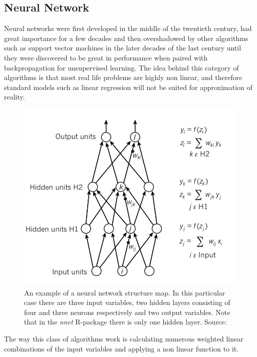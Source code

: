 \documentclass[a4paper,12pt]{article}
\begin{document}
\subsection{Neural Network}

Neural networks were first developed in the middle of the twentieth century, had great importance for a few decades and then overshadowed by other algorithms such as support vector machines in the later decades of the last century until they were discovered to be great in performance when paired with backpropagation for unsupervised learning.
The idea behind this category of algorithms is that most real life problems are highly non linear, and therefore standard models such as linear regression will not be suited for approximation of reality.
\begin{figure}
  \begin{minipage}[c]{0.65\textwidth}
    \includegraphics[width=\textwidth]{pictures/nnet_1.png}
  \end{minipage}\hfill
  \begin{minipage}[c]{0.35\textwidth}
    \caption{An example of a neural network structure map. In this particular case there are three input variables, two hidden layers consisting of four and three neurons respectively and two output variables.
    Note that in the \textit{nnet} R-package there is only one hidden layer. Source: \cite{lecun2015}}
    \label{Figure::Nnet_1}
  \end{minipage}
\end{figure}
The way this class of algorithms work is calculating numerous weighted linear combinations of the input variables and applying a non linear function to it.
\end{document}
